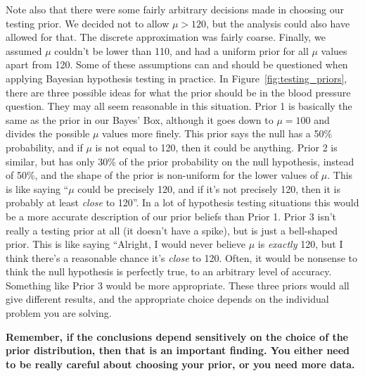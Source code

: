Note also that there were some fairly arbitrary decisions made in choosing our
testing prior. We decided not to allow $\mu > 120$, but the analysis could
also have allowed for that. The discrete approximation was fairly coarse. Finally, we
assumed $\mu$ couldn't be lower than 110, and had a uniform prior for all
$\mu$ values apart from 120. Some of these assumptions can and should be
questioned when applying Bayesian hypothesis testing in practice.
In Figure~\ref{fig:testing_priors}, there are three possible ideas for what
the prior should be in the blood pressure question. They may all seem reasonable in this situation.
Prior 1 is basically the same as the prior in our Bayes' Box, although it goes
down to $\mu=100$ and divides the possible $\mu$ values more finely. This prior
says the null has a 50\% probability, and if $\mu$ is not equal to 120, then it
could be anything.
Prior 2
is similar, but has only 30\% of the prior probability on the null hypothesis,
instead of 50\%,
and the shape of the prior is non-uniform for the lower values of $\mu$.
This is like saying ``$\mu$ could be precisely 120, and if it's not precisely
120, then it is probably at least {\it close} to 120''. In a lot of hypothesis
testing situations this would be a more accurate description of our prior
beliefs than Prior 1.
Prior 3 isn't really a testing prior at all (it doesn't have a spike), but is
just a bell-shaped prior. This is like saying ``Alright, I would never believe
$\mu$ is {\it exactly} 120, but I think there's a reasonable chance it's {\it
close} to 120. Often, it would be nonsense to think the null hypothesis
is perfectly true, to an arbitrary level of accuracy. Something like Prior 3
would be more appropriate.
These three priors would all give different results, and the appropriate choice
depends on the individual problem you are solving. 

\begin{framed}
{\bf Remember, if the conclusions depend sensitively on the choice of the
prior distribution, then that is an important finding. You either need to be
really careful about choosing your prior, or you need more data.}
\end{framed}

